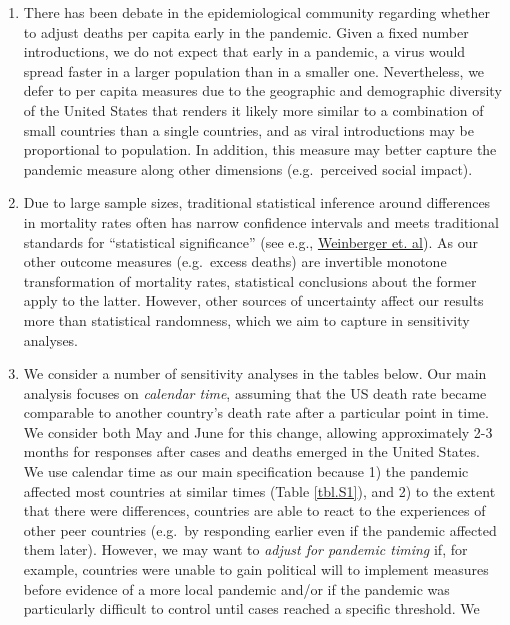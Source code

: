 \documentclass[
]{article}
\providecommand{\tightlist}{%
  \setlength{\itemsep}{0pt}\setlength{\parskip}{0pt}}
\begin{document}
\begin{enumerate}
\def\labelenumi{\arabic{enumi}.}
\tightlist
\item
  There has been debate in the epidemiological community regarding
  whether to adjust deaths per capita early in the pandemic. Given a
  fixed number introductions, we do not expect that early in a pandemic,
  a virus would spread faster in a larger population than in a smaller
  one. Nevertheless, we defer to per capita measures due to the
  geographic and demographic diversity of the United States that renders
  it likely more similar to a combination of small countries than a
  single countries, and as viral introductions may be proportional to
  population. In addition, this measure may better capture the pandemic
  measure along other dimensions (e.g.~perceived social impact).
\item
  Due to large sample sizes, traditional statistical inference around
  differences in mortality rates often has narrow confidence intervals
  and meets traditional standards for ``statistical significance'' (see
  e.g.,
  \href{https://jamanetwork.com/journals/jamainternalmedicine/fullarticle/2767980}{Weinberger et. al}).
  As our other outcome measures (e.g.~excess deaths) are invertible
  monotone transformation of mortality rates, statistical conclusions
  about the former apply to the latter. However, other sources of
  uncertainty affect our results more than statistical randomness, which
  we aim to capture in sensitivity analyses.
\item
  We consider a number of sensitivity analyses in the tables below. Our
  main analysis focuses on \emph{calendar time}, assuming that the US
  death rate became comparable to another country's death rate after a
  particular point in time. We consider both May and June for this
  change, allowing approximately 2-3 months for responses after cases
  and deaths emerged in the United States. We use calendar time as our
  main specification because 1) the pandemic affected most countries at
  similar times (Table \ref{tbl.S1}), and 2) to the extent that there
  were differences, countries are able to react to the experiences of
  other peer countries (e.g.~by responding earlier even if the pandemic
  affected them later). However, we may want to
  \emph{adjust for pandemic timing} if, for example, countries were
  unable to gain political will to implement measures before evidence of
  a more local pandemic and/or if the pandemic was particularly
  difficult to control until cases reached a specific threshold. We

\end{enumerate}
\end{document}

